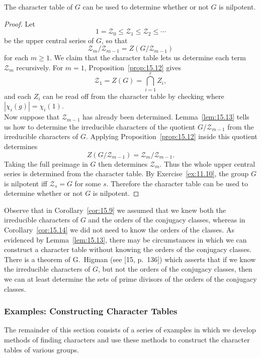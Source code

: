 \documentclass[../Odyssey_Project.tex]{subfiles}
\begin{document}
\begin{corollary}
\label{cor:15.14}
The character table of $G$ can be used to determine whether or not $G$ is nilpotent.
\end{corollary}
\begin{proof}
    Let
    \[
        1=\mathcal{Z}_0\leq\mathcal{Z}_1\leq\mathcal{Z}_2\leq\cdots
    \]
    be the upper central series of $G$, so that
    \[
        \mathcal{Z}_m/\mathcal{Z}_{m-1}=Z(G/\mathcal{Z}_{m-1})
    \]
    for each $m\geq1$. We claim that the character table lets us determine each term $\mathcal{Z}_m$ recursively. For $m=1$, Proposition~\ref{prop:15.12} gives
    \[
        \mathcal{Z}_1=Z(G)=\bigcap_{i=1}^{r}Z_i,
    \]
    and each $Z_i$ can be read off from the character table by checking where $|\chi_i(g)|=\chi_i(1)$.\\
    Now suppose that $\mathcal{Z}_{m-1}$ has already been determined. Lemma~\ref{lem:15.13} tells us how to determine the irreducible characters of the quotient $G/\mathcal{Z}_{m-1}$ from the irreducible characters of $G$. Applying Proposition~\ref{prop:15.12} inside this quotient determines
    \[
        Z(G/\mathcal{Z}_{m-1})=\mathcal{Z}_m/\mathcal{Z}_{m-1}.
    \]
    Taking the full preimage in $G$ then determines $\mathcal{Z}_m$. Thus the whole upper central series is determined from the character table. By Exercise~\ref{ex:11.10}, the group $G$ is nilpotent iff $\mathcal{Z}_s=G$ for some $s$. Therefore the character table can be used to determine whether or not $G$ is nilpotent.
\end{proof}

Observe that in Corollary~\ref{cor:15.9} we assumed that we knew both the irreducible characters of $G$ and the orders of the conjugacy classes, whereas in Corollary~\ref{cor:15.14} we did not need to know the orders of the classes. As evidenced by Lemma~\ref{lem:15.13}, there may be circumstances in which we can construct a character table without knowing the orders of the conjugacy classes. There is a theorem of G.\ Higman (see [15, p.\ 136]) which asserts that if we know the irreducible characters of $G$, but not the orders of the conjugacy classes, then we can at least determine the sets of prime divisors of the orders of the conjugacy classes.

\subsubsection*{Examples: Constructing Character Tables}

The remainder of this section consists of a series of examples in which we develop methods of finding characters and use these methods to construct the character tables of various groups.
\end{document}
